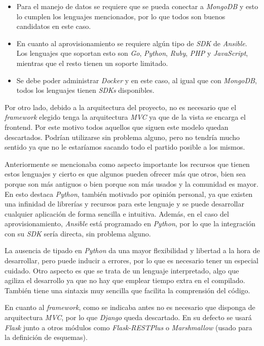 \begin{itemize}
	\item Para el manejo de datos se requiere que se pueda conectar a \textit{MongoDB} y esto lo cumplen los lenguajes mencionados, por lo que todos son buenos candidatos en este caso.
	\item En cuanto al aprovisionamiento se requiere algún tipo de \textit{SDK} de \textit{Ansible}. Los lenguajes que soportan esto son \textit{Go}, \textit{Python}, \textit{Ruby}, \textit{PHP} y \textit{JavaScript}, mientras que el resto tienen un soporte limitado.
	\item Se debe poder administrar \textit{Docker} y en este caso, al igual que con \textit{MongoDB}, todos los lenguajes tienen \textit{SDKs} disponibles.
\end{itemize}

Por otro lado, debido a la arquitectura del proyecto, no es necesario que el \textit{framework} elegido tenga la arquitectura \textit{MVC} ya que de la vista se encarga el frontend. Por este motivo todos aquellos que siguen este modelo quedan descartados. Podrían utilizarse sin problema alguno, pero no tendría mucho sentido ya que no le estaríamos sacando todo el partido posible a los mismos.

Anteriormente se mencionaba como aspecto importante los recursos que tienen estos lenguajes y cierto es que algunos pueden ofrecer más que otros, bien sea porque son más antiguos o bien porque son más usados y la comunidad es mayor. En esto destaca \textit{Python}, también motivado por opinión personal, ya que existen una infinidad de librerías y recursos para este lenguaje y se puede desarrollar cualquier aplicación de forma sencilla e intuitiva. Además, en el caso del aprovisionamiento, \textit{Ansible} está programado en \textit{Python}, por lo que la integración con su \textit{SDK} sería directa, sin problema alguno.

La ausencia de tipado en \textit{Python} da una mayor flexibilidad y libertad a la hora de desarrollar, pero puede inducir a errores, por lo que es necesario tener un especial cuidado. Otro aspecto es que se trata de un lenguaje interpretado, algo que agiliza el desarrollo ya que no hay que emplear tiempo extra en el compilado. También tiene una sintaxis muy sencilla que facilita la comprensión del código.

En cuanto al \textit{framework}, como se indicaba antes no es necesario que disponga de arquitectura \textit{MVC}, por lo que \textit{Django} queda descartado. En su defecto se usará \textit{Flask} junto a otros módulos como \textit{Flask-RESTPlus} o \textit{Marshmallow} (usado para la definición de esquemas).

